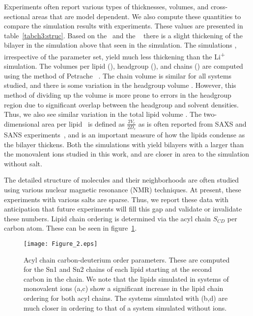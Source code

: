 Experiments often report various types of thicknesses, volumes, and cross-sectional areas that are model dependent.
We also compute these quantities to compare the simulation results with experiments. These values are presented in 
table~\ref{tabch3:struc}.
Based on the \dhh~and the \dc~ there is a slight thickening 
of the bilayer in the \li{} {simulation} above that seen in the \na{} {simulation}.
The \mg{} simulations {, irrespective of the parameter set, yield} much less thickening than {the}  
Li\textsuperscript{+} {simulation.} 
{The volumes per lipid (\vl), headgroup (\vh), and chains (\vc) are computed using the method of
Petrache \etal{}~\cite{petrache:1997}.
The chain volume \vc{} is similar for all systems studied, and there is some variation in the headgroup volume \vh{}.
However, this method of dividing up the volume is more prone to errors in the headgroup region due to 
significant overlap between the headgroup and solvent densities. 
Thus, we also see similar variation in the total lipid volume \vl{}. 
}
The two-dimensional area per lipid \al~is defined as
{$\frac{2V_c}{2D_c}$ as is often reported from SAXS and SANS experiments~\cite{nagle:2000}, and is an important
measure of how the lipids condense as the bilayer thickens.}
{Both the simulations with \mg{} yield bilayers with a larger \al{} 
    than the monovalent ions studied in this work, and are closer
in area to the simulation without salt.
}

The detailed structure of molecules and their neighborhoods are often studied using 
various nuclear magnetic resonance (NMR) techniques.
{At present, these experiments with various salts are sparse.}
{Thus,} we report these data with anticipation that future experiments will fill this gap and validate
or invalidate
these numbers.
Lipid chain ordering is determined via the acyl chain $S_{CD}$ per carbon
atom. These can be seen in figure~\ref{figch3:op}. 
\begin{figure}[H]
    \caption[Acyl chain order parameters]{Acyl chain carbon-deuterium order parameters. These are computed for the Sn1 and Sn2 chains of each lipid starting at the 
        second carbon in the chain\cite{egberts:1988,Douliez:1995}. We note that the lipids simulated in systems of monovalent ions (a,c) show a significant increase
in the lipid chain ordering for both acyl chains. The systems simulated with \mg (b,d) are much closer in ordering to that of a system
simulated without ions.}
    \label{figch3:op}
    \texttt{[image: Figure\_2.eps]}
\end{figure}

